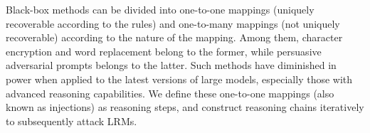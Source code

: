 Black-box methods can be divided into one-to-one mappings (uniquely recoverable according to the rules) and one-to-many mappings (not uniquely recoverable) according to the nature of the mapping. Among them, character encryption \citep{cipher} and word replacement \citep{wordsubstitution} belong to the former, while persuasive adversarial prompts \citep{pap} belongs to the latter. Such methods have diminished in power when applied to the latest versions of large models, especially those with advanced reasoning capabilities. We define these one-to-one mappings (also known as injections) as reasoning steps, and construct reasoning chains iteratively to subsequently attack LRMs.